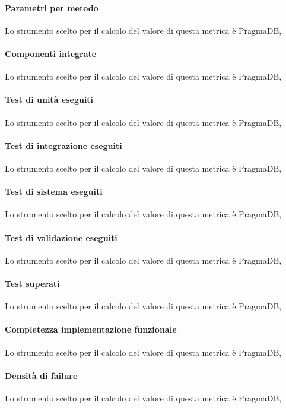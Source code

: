 \paragraph{Parametri per metodo}
Lo strumento scelto per il calcolo del valore di questa metrica è PragmaDB,
\paragraph{Componenti integrate}
Lo strumento scelto per il calcolo del valore di questa metrica è PragmaDB,
\paragraph{Test di unità eseguiti}
Lo strumento scelto per il calcolo del valore di questa metrica è PragmaDB,
\paragraph{Test di integrazione eseguiti}
Lo strumento scelto per il calcolo del valore di questa metrica è PragmaDB,
\paragraph{Test di sistema eseguiti}
Lo strumento scelto per il calcolo del valore di questa metrica è PragmaDB,
\paragraph{Test di validazione eseguiti}
Lo strumento scelto per il calcolo del valore di questa metrica è PragmaDB,
\paragraph{Test superati}
Lo strumento scelto per il calcolo del valore di questa metrica è PragmaDB,
\paragraph{Completezza implementazione funzionale}
Lo strumento scelto per il calcolo del valore di questa metrica è PragmaDB,
\paragraph{Densità di failure}
Lo strumento scelto per il calcolo del valore di questa metrica è PragmaDB,